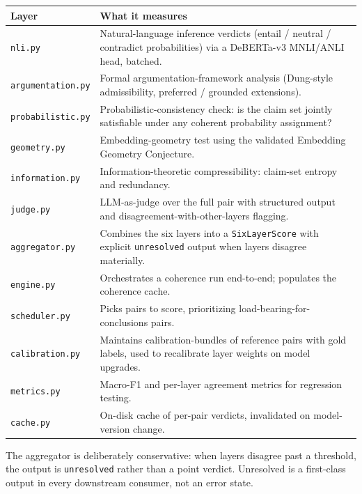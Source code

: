 \documentclass[11pt,letterpaper]{article}
\newcommand{\mod}[1]{\texttt{#1}}
\begin{document}
\begin{table}[h]
\small
\begin{tabular}{p{3cm} p{11.5cm}}
\toprule
\textbf{Layer} & \textbf{What it measures} \\
\midrule
\mod{nli.py}               & Natural-language inference verdicts (entail / neutral / contradict probabilities) via a DeBERTa-v3 MNLI/ANLI head, batched. \\
\mod{argumentation.py}     & Formal argumentation-framework analysis (Dung-style admissibility, preferred / grounded extensions). \\
\mod{probabilistic.py}     & Probabilistic-consistency check: is the claim set jointly satisfiable under any coherent probability assignment? \\
\mod{geometry.py}          & Embedding-geometry test using the validated Embedding Geometry Conjecture. \\
\mod{information.py}       & Information-theoretic compressibility: claim-set entropy and redundancy. \\
\mod{judge.py}             & LLM-as-judge over the full pair with structured output and disagreement-with-other-layers flagging. \\
\mod{aggregator.py}        & Combines the six layers into a \texttt{SixLayerScore} with explicit \texttt{unresolved} output when layers disagree materially. \\
\mod{engine.py}            & Orchestrates a coherence run end-to-end; populates the coherence cache. \\
\mod{scheduler.py}         & Picks pairs to score, prioritizing load-bearing-for-conclusions pairs. \\
\mod{calibration.py}       & Maintains calibration-bundles of reference pairs with gold labels, used to recalibrate layer weights on model upgrades. \\
\mod{metrics.py}           & Macro-F1 and per-layer agreement metrics for regression testing. \\
\mod{cache.py}             & On-disk cache of per-pair verdicts, invalidated on model-version change. \\
\bottomrule
\end{tabular}
\end{table}

The aggregator is deliberately conservative: when layers disagree past a threshold, the output is \texttt{unresolved} rather than a point verdict. Unresolved is a first-class output in every downstream consumer, not an error state.
\end{document}
